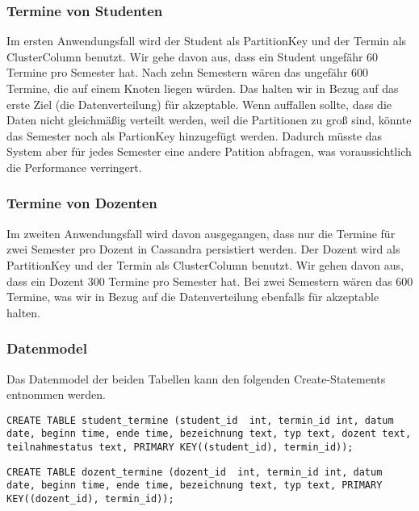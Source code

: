 \vspace{12pt}

\subsubsection{Termine von Studenten}
Im ersten Anwendungsfall wird der Student als PartitionKey und der Termin als ClusterColumn benutzt.
Wir gehe davon aus, dass ein Student ungefähr 60 Termine pro Semester hat. Nach zehn Semestern wären das ungefähr 600 Termine, die auf einem Knoten liegen würden. Das halten wir in Bezug auf das erste Ziel (die Datenverteilung) für akzeptable. Wenn auffallen sollte, dass die Daten nicht gleichmäßig verteilt werden, weil die Partitionen zu groß sind, könnte das Semester noch als PartionKey hinzugefügt werden. Dadurch müsste das System aber für jedes Semester eine andere Patition abfragen, was voraussichtlich die Performance verringert.

\vspace{12pt}

\subsubsection{Termine von Dozenten}
Im zweiten Anwendungsfall wird davon ausgegangen, dass nur die Termine für zwei Semester pro Dozent in Cassandra persistiert werden. Der Dozent wird als PartitionKey und der Termin als ClusterColumn benutzt. Wir gehen davon aus, dass ein Dozent 300 Termine pro Semester hat. Bei zwei Semestern wären das 600 Termine, was wir in Bezug auf die Datenverteilung ebenfalls für akzeptable halten.

\vspace{12pt}

\subsubsection{Datenmodel}
Das Datenmodel der beiden Tabellen kann den folgenden Create-Statements entnommen werden.
\begin{lstlisting}
CREATE TABLE student_termine (student_id  int, termin_id int, datum date, beginn time, ende time, bezeichnung text, typ text, dozent text, teilnahmestatus text, PRIMARY KEY((student_id), termin_id));
\end{lstlisting}
\begin{lstlisting}
CREATE TABLE dozent_termine (dozent_id  int, termin_id int, datum date, beginn time, ende time, bezeichnung text, typ text, PRIMARY KEY((dozent_id), termin_id));
\end{lstlisting}

